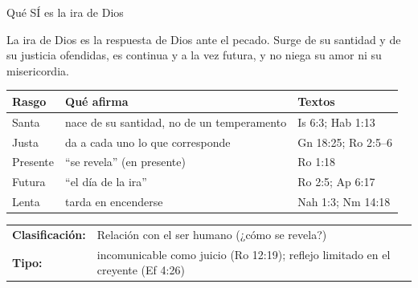 \begin{frame}{Qué SÍ es la ira de Dios}
\begin{tcolorbox}[colback=papiro,colframe=azul,boxrule=1pt,arc=3pt,fonttitle=\bfseries\small,title=Definición]
\small La ira de Dios es la respuesta  de Dios ante el pecado. Surge de su santidad y de su justicia ofendidas, es continua y a la vez futura, y no niega su amor ni su misericordia.
\end{tcolorbox}
\scriptsize\renewcommand{\arraystretch}{1.25}
\begin{tabular}{@{}>{\RaggedRight\arraybackslash}p{2.4cm}>{\RaggedRight\arraybackslash}p{5.6cm}>{\RaggedRight\arraybackslash}p{3.6cm}@{}}
\toprule
\textbf{Rasgo} & \textbf{Qué afirma} & \textbf{Textos} \\ \midrule
Santa & nace de su santidad, no de un temperamento & Is 6:3; Hab 1:13 \\
Justa & da a cada uno lo que corresponde & Gn 18:25; Ro 2:5--6 \\
Presente & ``se revela'' (en presente) & Ro 1:18 \\
Futura & ``el día de la ira'' & Ro 2:5; Ap 6:17 \\
Lenta & tarda en encenderse & Nah 1:3; Nm 14:18 \\
\bottomrule
\end{tabular}\par\smallskip
\begin{center}\footnotesize
\begin{tabular}{ll}
\textbf{Clasificación:} & Relación con el ser humano (¿cómo se revela?)\\
\textbf{Tipo:} & incomunicable como juicio (Ro 12:19); reflejo limitado en el creyente (Ef 4:26)\\
\end{tabular}
\end{center}
\end{frame}

